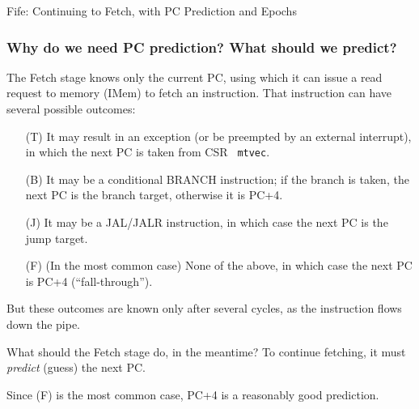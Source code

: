 \begin{frame}

\begin{center}
  {\LARGE Fife: Continuing to Fetch, with PC Prediction and Epochs}
\end{center}

\end{frame}


\begin{frame}[fragile]
\frametitle{Why do we need PC prediction?  What should we predict?}

\footnotesize

The Fetch stage knows only the current PC, using which it can issue a
read request to memory (IMem) to fetch an instruction.  That
instruction can have several possible outcomes:

\vspace{2ex}

\begin{itemize}

  \item[(T)] It may result in an exception (or be preempted by an external
        interrupt), in which the next PC is taken from CSR {\tt
        mtvec}.

  \item[(B)] It may be a conditional BRANCH instruction; if the branch is
        taken, the next PC is the branch target, otherwise it is PC+4.

  \item[(J)] It may be a JAL/JALR instruction, in which case the next PC is the jump target.

  \item[(F)] (In the most common case) None of the above, in which case the next PC is PC+4 (``fall-through'').

\end{itemize}

\vspace{2ex}

But these outcomes are known only after several cycles, as the instruction flows down the pipe.

\vspace{2ex}

What should the Fetch stage do, in the meantime? \hmm To continue
fetching, it must \emph{predict} (guess) the next PC.

\vspace{2ex}

Since (F) is the most common case, PC+4 is a reasonably good prediction.

\end{frame}

